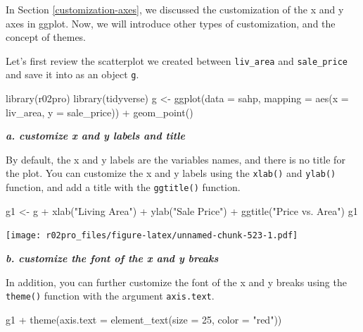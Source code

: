 \documentclass[
]{book}
\newenvironment{Shaded}{\begin{snugshade}}{\end{snugshade}}
\newcommand{\AttributeTok}[1]{\textcolor[rgb]{0.77,0.63,0.00}{#1}}
\newcommand{\DecValTok}[1]{\textcolor[rgb]{0.00,0.00,0.81}{#1}}
\newcommand{\FunctionTok}[1]{\textcolor[rgb]{0.00,0.00,0.00}{#1}}
\newcommand{\NormalTok}[1]{#1}
\newcommand{\OtherTok}[1]{\textcolor[rgb]{0.56,0.35,0.01}{#1}}
\newcommand{\SpecialCharTok}[1]{\textcolor[rgb]{0.00,0.00,0.00}{#1}}
\newcommand{\StringTok}[1]{\textcolor[rgb]{0.31,0.60,0.02}{#1}}
\begin{document}
In Section \ref{customization-axes}, we discussed the customization of the x and y axes in ggplot. Now, we will introduce other types of customization, and the concept of themes.

Let's first review the scatterplot we created between \texttt{liv\_area} and \texttt{sale\_price} and save it into as an object \texttt{g}.

\begin{Shaded}
\begin{Highlighting}[]
\FunctionTok{library}\NormalTok{(r02pro)}
\FunctionTok{library}\NormalTok{(tidyverse)}
\NormalTok{g }\OtherTok{\textless{}{-}} \FunctionTok{ggplot}\NormalTok{(}\AttributeTok{data =}\NormalTok{ sahp, }\AttributeTok{mapping =} \FunctionTok{aes}\NormalTok{(}\AttributeTok{x =}\NormalTok{ liv\_area, }\AttributeTok{y =}\NormalTok{ sale\_price)) }\SpecialCharTok{+} \FunctionTok{geom\_point}\NormalTok{()}
\end{Highlighting}
\end{Shaded}

\textbf{\emph{a. customize x and y labels and title}}

By default, the x and y labels are the variables names, and there is no title for the plot. You can customize the x and y labels using the \texttt{xlab()} and \texttt{ylab()} function, and add a title with the \texttt{ggtitle()} function.

\begin{Shaded}
\begin{Highlighting}[]
\NormalTok{g1 }\OtherTok{\textless{}{-}}\NormalTok{ g }\SpecialCharTok{+} \FunctionTok{xlab}\NormalTok{(}\StringTok{"Living Area"}\NormalTok{) }\SpecialCharTok{+} 
  \FunctionTok{ylab}\NormalTok{(}\StringTok{"Sale Price"}\NormalTok{) }\SpecialCharTok{+} 
  \FunctionTok{ggtitle}\NormalTok{(}\StringTok{"Price vs. Area"}\NormalTok{)}
\NormalTok{g1 }
\end{Highlighting}
\end{Shaded}

\texttt{[image: r02pro\_files/figure-latex/unnamed-chunk-523-1.pdf]}

\textbf{\emph{b. customize the font of the x and y breaks}}

In addition, you can further customize the font of the x and y breaks using the \texttt{theme()} function with the argument \texttt{axis.text}.

\begin{Shaded}
\begin{Highlighting}[]
\NormalTok{g1 }\SpecialCharTok{+} \FunctionTok{theme}\NormalTok{(}\AttributeTok{axis.text =} \FunctionTok{element\_text}\NormalTok{(}\AttributeTok{size =} \DecValTok{25}\NormalTok{, }\AttributeTok{color =} \StringTok{"red"}\NormalTok{))}
\end{Highlighting}
\end{Shaded}
\end{document}
